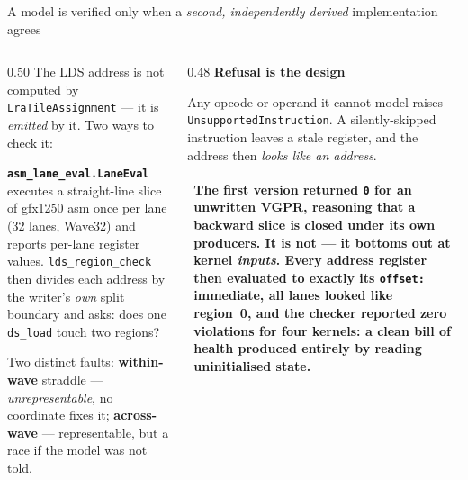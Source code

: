 \documentclass[aspectratio=169,9pt]{beamer}
\newcommand{\tsub}[1]{{\footnotesize\color{gray}#1}}
\newcommand{\key}[1]{\textcolor{acc}{\textbf{#1}}}
\newcommand{\bad}[1]{\textcolor{warn}{\textbf{#1}}}
\newcommand{\good}[1]{\textcolor{ok}{\textbf{#1}}}
\begin{document}
\begin{frame}{A model is verified only when a \emph{second, independently derived} implementation agrees}

\begin{columns}[T]
\begin{column}{0.50\textwidth}
\footnotesize
The LDS address is not computed by \texttt{LraTileAssignment} --- it is \emph{emitted} by it. Two
ways to check it:

\smallskip
{}

\smallskip
\key{\texttt{asm\_lane\_eval.LaneEval}} executes a straight-line slice of gfx1250 asm once per
lane (32 lanes, Wave32) and reports per-lane register values. \texttt{lds\_region\_check} then
divides each address by the writer's \emph{own} split boundary and asks: does one
\texttt{ds\_load} touch two regions?

\smallskip
Two distinct faults: \bad{within-wave} straddle --- \emph{unrepresentable}, no coordinate fixes
it; \bad{across-wave} --- representable, but a race if the model was not told.
\end{column}

\begin{column}{0.48\textwidth}
\footnotesize
\textbf{Refusal is the design}

Any opcode or operand it cannot model raises \texttt{UnsupportedInstruction}. A silently-skipped
instruction leaves a stale register, and the address then \emph{looks like an address}.

\smallskip
\begin{tabular}{@{}p{}@{}}
\toprule
The first version returned \texttt{0} for an unwritten VGPR, reasoning that a backward slice is
closed under its own producers. \bad{It is not} --- it bottoms out at kernel \emph{inputs}. Every
address register then evaluated to exactly its \texttt{offset:} immediate, all lanes looked like
region~0, and the checker reported \bad{zero violations for four kernels}: a clean bill of health
produced entirely by reading uninitialised state. \\
\bottomrule
\end{tabular}


\end{column}
\end{columns}
\end{frame}
\end{document}
